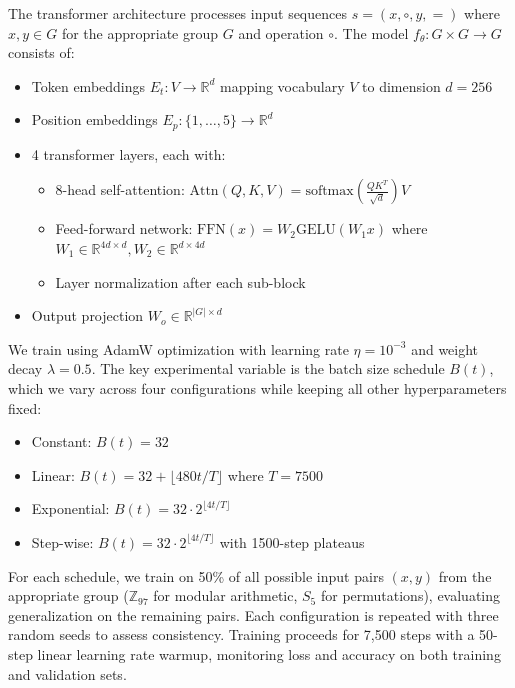 \documentclass{article} %
\begin{document}
The transformer architecture processes input sequences $s = (x, \circ, y, =)$ where $x,y \in G$ for the appropriate group $G$ and operation $\circ$. The model $f_\theta: G \times G \rightarrow G$ consists of:

\begin{itemize}
    \item Token embeddings $E_t: V \rightarrow \mathbb{R}^d$ mapping vocabulary $V$ to dimension $d=256$
    \item Position embeddings $E_p: \{1,\ldots,5\} \rightarrow \mathbb{R}^d$ 
    \item 4 transformer layers, each with:
        \begin{itemize}
            \item 8-head self-attention: $\text{Attn}(Q,K,V) = \text{softmax}(\frac{QK^T}{\sqrt{d}})V$
            \item Feed-forward network: $\text{FFN}(x) = W_2\text{GELU}(W_1x)$ where $W_1 \in \mathbb{R}^{4d \times d}, W_2 \in \mathbb{R}^{d \times 4d}$
            \item Layer normalization after each sub-block
        \end{itemize}
    \item Output projection $W_o \in \mathbb{R}^{|G| \times d}$ 
\end{itemize}

We train using AdamW optimization with learning rate $\eta=10^{-3}$ and weight decay $\lambda=0.5$. The key experimental variable is the batch size schedule $B(t)$, which we vary across four configurations while keeping all other hyperparameters fixed:

\begin{itemize}
    \item Constant: $B(t) = 32$
    \item Linear: $B(t) = 32 + \lfloor 480t/T \rfloor$ where $T=7500$
    \item Exponential: $B(t) = 32 \cdot 2^{\lfloor 4t/T \rfloor}$
    \item Step-wise: $B(t) = 32 \cdot 2^{\lfloor 4t/T \rfloor}$ with 1500-step plateaus
\end{itemize}

For each schedule, we train on 50\% of all possible input pairs $(x,y)$ from the appropriate group ($\mathbb{Z}_{97}$ for modular arithmetic, $S_5$ for permutations), evaluating generalization on the remaining pairs. Each configuration is repeated with three random seeds to assess consistency. Training proceeds for 7,500 steps with a 50-step linear learning rate warmup, monitoring loss and accuracy on both training and validation sets.
\end{document}

